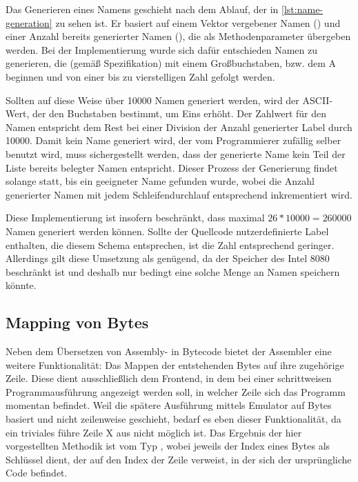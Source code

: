 Das Generieren eines Namens geschieht nach dem Ablauf, der in \ref{lst:name-generation} zu sehen ist. Er basiert auf einem Vektor vergebener Namen () und einer Anzahl bereits generierter Namen (), die als Methodenparameter übergeben werden. Bei der Implementierung wurde sich dafür entschieden Namen zu generieren, die (gemäß Spezifikation) mit einem Großbuchstaben, bzw. dem \glqq A\grqq{} beginnen und von einer bis zu vierstelligen Zahl gefolgt werden.

Sollten auf diese Weise über 10000 Namen generiert werden, wird der ASCII-Wert, der den Buchstaben bestimmt, um Eins erhöht. Der Zahlwert für den Namen entspricht dem Rest bei einer Division der Anzahl generierter Label durch 10000. Damit kein Name generiert wird, der vom Programmierer zufällig selber benutzt wird, muss sichergestellt werden, dass der generierte Name kein Teil der Liste bereits belegter Namen entspricht. Dieser Prozess der Generierung findet solange statt, bis ein geeigneter Name gefunden wurde, wobei die Anzahl generierter Namen mit jedem Schleifendurchlauf entsprechend inkrementiert wird.

Diese Implementierung ist insofern beschränkt, dass maximal $26 * 10000 = 260000$ Namen generiert werden können. Sollte der Quellcode nutzerdefinierte Label enthalten, die diesem Schema entsprechen, ist die Zahl entsprechend geringer. Allerdings gilt diese Umsetzung als genügend, da der Speicher des Intel 8080 beschränkt ist und deshalb nur bedingt eine solche Menge an Namen speichern könnte.

\subsection{Mapping von Bytes}

Neben dem Übersetzen von Assembly- in Bytecode bietet der Assembler eine weitere Funktionalität: Das Mappen der entstehenden Bytes auf ihre zugehörige Zeile. Diese dient ausschließlich dem Frontend, in dem bei einer schrittweisen Programmausführung angezeigt werden soll, in welcher Zeile sich das Programm momentan befindet. Weil die spätere Ausführung mittels Emulator auf Bytes basiert und nicht zeilenweise geschieht, bedarf es eben dieser Funktionalität, da ein triviales \glqq führe Zeile X aus\grqq{} nicht möglich ist. Das Ergebnis der hier vorgestellten Methodik ist vom Typ , wobei jeweils der Index eines Bytes als Schlüssel dient, der auf den Index der Zeile verweist, in der sich der ursprüngliche Code befindet.


